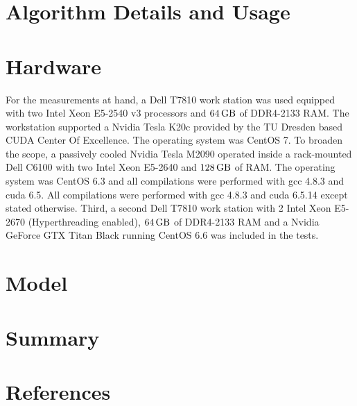 \documentclass [a4paper,12pt]{article}
\begin{document}
\section{Algorithm Details and Usage}
\label{sec:alg}


\clearpage
\section{Hardware}
\label{sec:hw}

For the measurements at hand, a Dell T7810 work station was used equipped with two Intel Xeon E5-2540 v3 processors and $\unit[64]{GB}$ of DDR4-2133 RAM. The workstation supported a Nvidia Tesla K20c provided by the TU Dresden based CUDA Center Of Excellence. The operating system was CentOS 7. To broaden the scope, a passively cooled Nvidia Tesla M2090 operated inside a rack-mounted Dell C6100 with two Intel Xeon E5-2640 and $\unit[128]{GB}$ of RAM. The operating system was CentOS 6.3 and all compilations were performed with gcc 4.8.3 and cuda 6.5. All compilations were performed with gcc 4.8.3 and cuda 6.5.14 except stated otherwise. Third, a second Dell T7810 work station with 2 Intel Xeon E5-2670 (Hyperthreading enabled), $\unit[64]{GB}$ of DDR4-2133 RAM and a Nvidia GeForce GTX Titan Black running CentOS 6.6 was included in the tests.

\clearpage
\section{Model}
\label{sec:models}



\clearpage
\section{Summary}
\label{sec:summ}


\section{References}


\end{document}
